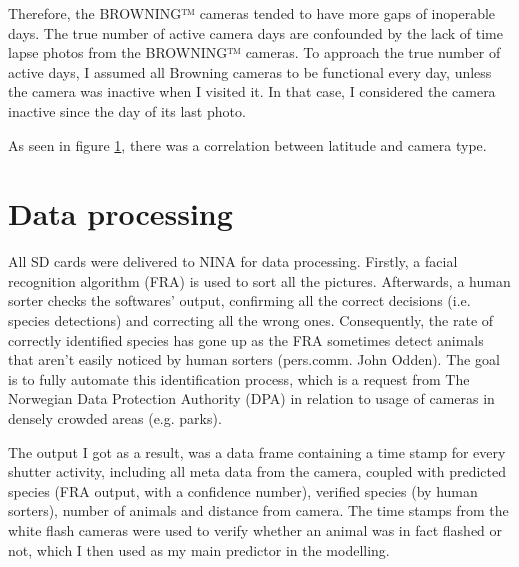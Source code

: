 Therefore, the BROWNING™ cameras tended to have more gaps of inoperable days.
The true number of active camera days are confounded by the lack of time lapse photos from the BROWNING™ cameras. To approach the true number of active days, I assumed all Browning cameras to be functional every day, unless the camera was inactive when I visited it. In that case, I considered the camera inactive since the day of its last photo.


As seen in figure \ref{fig:map}, %
there was a correlation between latitude and camera type.



\begin{figure}
	\label{fig:map}
\end{figure}




\section{Data processing} %
All SD cards were delivered to NINA for data processing.
Firstly, a facial recognition algorithm (FRA)  is used to sort all the pictures. %
Afterwards, a human sorter checks the softwares' output, confirming all the correct decisions (i.e. species detections) and correcting all the wrong ones. 
Consequently, the rate of correctly identified species has gone up as the FRA sometimes detect animals that aren't easily noticed by human sorters (pers.comm. John Odden). 
The goal is to fully automate this identification process, which is a request from The Norwegian Data Protection Authority (DPA) in relation to usage of cameras in densely crowded areas (e.g. parks).





The output I got as a result, was a data frame containing a time stamp for every shutter activity, %
including all meta data from the camera, coupled with predicted species (FRA output, with a confidence number), verified species (by human sorters), number of animals and distance from camera. The time stamps from the white flash cameras were used to verify whether an animal was in fact flashed or not, which I then used as my main predictor in the modelling. 


